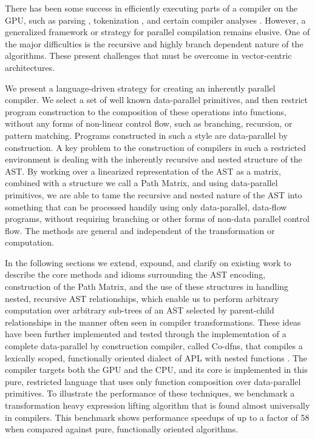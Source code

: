 ﻿\documentclass[numbers,10pt,preprint]{sigplanconf}
\begin{document}
There has been some success in efficiently executing parts of a compiler on the GPU, such as parsing \cite{bunda1984apl}, tokenization \cite{bernecky2003tokenizer}, and certain compiler analyses \cite{prabhu2011eigencfa,mendez2012inclusion}. However, a generalized framework or strategy for parallel compilation remains elusive. One of the major difficulties is the recursive and highly branch dependent nature of the algorithms. These present challenges that must be overcome in vector-centric architectures.

We present a language-driven strategy for creating an inherently parallel compiler. We select a set of well known data-parallel primitives, and then restrict program construction to the composition of these operations into functions, without any forms of non-linear control flow, such as branching, recursion, or pattern matching. Programs constructed in such a style are data-parallel by construction. A key problem to the construction of compilers in such a restricted environment is dealing with the inherently recursive and nested structure of the AST. By working over a linearized representation of the AST as a matrix, combined with a structure we call a Path Matrix, and using data-parallel primitives, we are able to tame the recursive and nested nature of the AST into something that can be processed handily using only data-parallel, data-flow programs, without requiring branching or other forms of non-data parallel control flow. The methods are general and independent of the transformation or computation.

In the following sections we extend, expound, and clarify on existing work \cite{hsu2016key} to describe the core methods and idioms surrounding the AST encoding, construction of the Path Matrix, and the use of these structures in handling nested, recursive AST relationships, which enable us to perform arbitrary computation over arbitrary sub-trees of an AST selected by parent-child relationships in the manner often seen in compiler transformations. These ideas have been further implemented and tested through the implementation of a complete data-parallel by construction compiler, called Co-dfns, that compiles a lexically scoped, functionally oriented dialect of APL with nested functions \cite{hsu2014co,hsu2015accelerating}. The compiler targets both the GPU and the CPU, and its core is implemented in this pure, restricted language that uses only function composition over data-parallel primitives. To illustrate the performance of these techniques, we benchmark a transformation heavy expression lifting algorithm that is found almost universally in compilers. This benchmark shows performance speedups of up to a factor of 58 when compared against pure, functionally oriented algorithms.
\end{document}
